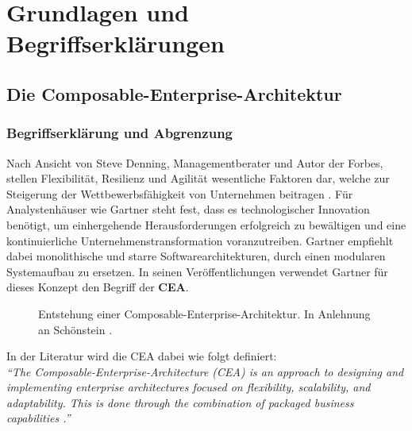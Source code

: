 \section{Grundlagen und Begriffserklärungen}

\subsection{Die Composable-Enterprise-Architektur}

\subsubsection{Begriffserklärung und Abgrenzung}
\label{sec:CEA_B}
Nach Ansicht von Steve Denning, Managementberater und Autor der Forbes, stellen Flexibilität, Resilienz und Agilität wesentliche Faktoren dar, welche zur Steigerung der Wettbewerbsfähigkeit von Unternehmen beitragen \cite{Denning.20170210}. Für Analystenhäuser wie Gartner steht fest, dass es technologischer Innovation benötigt, um einhergehende Herausforderungen erfolgreich zu bewältigen und eine kontinuierliche Unternehmenstransformation voranzutreiben. Gartner empfiehlt dabei monolithische und starre Softwarearchitekturen, durch einen modularen Systemaufbau zu ersetzen. In seinen Veröffentlichungen verwendet Gartner für dieses Konzept den Begriff der \textbf{\ac{CEA}}.
\begin{center}
	\begin{figure}[H]
		\centering
		\caption[Entstehung einer Composable-Enterprise-Architektur]{Entstehung einer Composable-Enterprise-Architektur. In Anlehnung an Schönstein \cite{Schonenstein.20230103}.}
		\label{fig:CEA_S}
	\end{figure}	
\end{center}
\vspace*{-15mm}
In der Literatur wird die CEA dabei wie folgt definiert:\vspace{2mm}\\
\textit{\enquote{The Composable-Enterprise-Architecture (CEA) is an approach to designing and implementing enterprise architectures focused on flexibility, scalability, and adaptability. This is done through the combination of packaged business capabilities \cite{Gartner.20230418}.}}\vspace{2mm}\\
